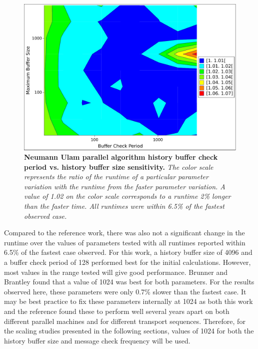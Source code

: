 \begin{figure}[t!]
  \begin{center}
    \includegraphics[width=6in]{chapters/parallel_mc/titan_comm_parameters.pdf}
  \end{center}
  \caption{\textbf{Neumann Ulam parallel algorithm history buffer
      check period vs. history buffer size sensitivity.} \textit{The
      color scale represents the ratio of the runtime of a particular
      parameter variation with the runtime from the faster parameter
      variation. A value of 1.02 on the color scale corresponds to a
      runtime 2\% longer than the faster time. All runtimes were
      within 6.5\% of the fastest observed case.}}
  \label{fig:titan_comm_parameters}
\end{figure}

Compared to the reference work, there was also not a significant
change in the runtime over the values of parameters tested with all
runtimes reported within 6.5\% of the fastest case observed. For this
work, a history buffer size of 4096 and a buffer check period of 128
performed best for the initial calculations. However, most values in
the range tested will give good performance. Brunner and Brantley
found that a value of 1024 was best for both parameters. For the
results observed here, these parameters were only 0.7\% slower than
the fastest case. It may be best practice to fix these parameters
internally at 1024 as both this work and the reference found these to
perform well several years apart on both different parallel machines
and for different transport sequences. Therefore, for the scaling
studies presented in the following sections, values of 1024 for both
the history buffer size and message check frequency will be used.

